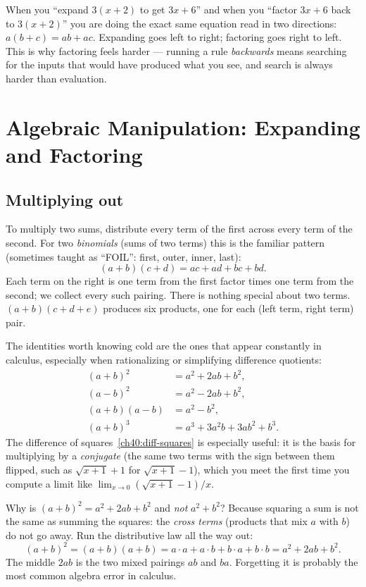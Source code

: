 \begin{happeningbox}
When you ``expand $3(x+2)$ to get $3x+6$'' and when you ``factor $3x+6$ back to
$3(x+2)$'' you are doing the exact same equation read in two directions:
$a(b+c) = ab+ac$. Expanding goes left to right; factoring goes right to left.
This is why factoring feels harder --- running a rule \emph{backwards} means
searching for the inputs that would have produced what you see, and search is
always harder than evaluation.
\end{happeningbox}

\section{Algebraic Manipulation: Expanding and Factoring}
\label{ch40:factoring}

\subsection{Multiplying out}

To multiply two sums, distribute every term of the first across every term of the
second. For two \emph{binomials} (sums of two terms) this is the familiar pattern
(sometimes taught as ``FOIL'': first, outer, inner, last):
\[
  (a+b)(c+d) = ac + ad + bc + bd.
\]
Each term on the right is one term from the first factor times one term from the
second; we collect every such pairing. There is nothing special about two terms.
$(a+b)(c+d+e)$ produces six products, one for each (left term, right term) pair.

The identities worth knowing cold are the ones that appear constantly in
calculus, especially when rationalizing or simplifying difference quotients:
\begin{align}
  (a+b)^2 &= a^2 + 2ab + b^2, \label{ch40:square-sum}\\
  (a-b)^2 &= a^2 - 2ab + b^2, \\
  (a+b)(a-b) &= a^2 - b^2, \label{ch40:diff-squares}\\
  (a+b)^3 &= a^3 + 3a^2 b + 3ab^2 + b^3.
\end{align}
The difference of squares~\eqref{ch40:diff-squares} is especially useful: it
is the basis for multiplying by a \emph{conjugate} (the same two terms with the
sign between them flipped, such as $\sqrt{x+1}+1$ for $\sqrt{x+1}-1$), which you
meet the first time you compute a limit like $\lim_{x\to 0}(\sqrt{x+1}-1)/x$.

\begin{whybox}
Why is $(a+b)^2 = a^2 + 2ab + b^2$ and \emph{not} $a^2 + b^2$? Because squaring a
sum is not the same as summing the squares: the \emph{cross terms} (products that
mix $a$ with $b$) do not go away. Run the distributive law all the way out:
\[
  (a+b)^2 = (a+b)(a+b) = a\cdot a + a \cdot b + b \cdot a + b \cdot b
          = a^2 + 2ab + b^2.
\]
The middle $2ab$ is the two mixed pairings $ab$ and $ba$. Forgetting it is
probably the most common algebra error in calculus.
\end{whybox}

